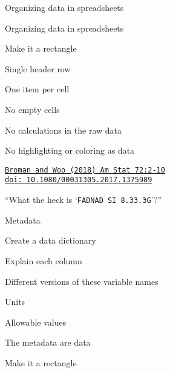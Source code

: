 \documentclass[aspectratio=169,12pt,t]{beamer}
\begin{document}
\begin{frame}[c]{Organizing data in spreadsheets}



  \note{}
\end{frame}




\begin{frame}[c]{Organizing data in spreadsheets}


  \bbi
\item Make it a rectangle
\item Single header row
\item One item per cell
\item No empty cells
\item No calculations in the raw data
\item No highlighting or coloring as data
  \ei

\vspace{8mm}

\hfill
\href{https://doi.org/10.1080/00031305.2017.1375989}{\footnotesize
  \lolit \tt Broman and Woo (2018) Am Stat 72:2-10 \\
  \hfill doi: 10.1080/00031305.2017.1375989}

  \note{}
\end{frame}




\begin{frame}[c]{}

\begin{center}
  \Large


``What the heck is `{\hilit \tt FAD{\textunderscore}NAD SI 8.3{\textunderscore}3.3G}'?''

\end{center}


\end{frame}




\begin{frame}[c]{Metadata}

  \bbi
\item Create a data dictionary
  \bi
\item Explain each column
\item Different versions of these variable names
\item Units
\item Allowable values
  \ei
\item The metadata are data
  \bi
\item Make it a rectangle
  \ei
\ei

  \note{}

\end{frame}
\end{document}
